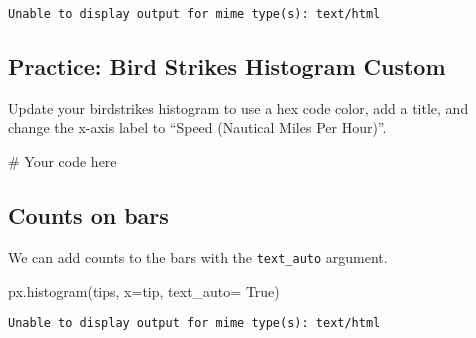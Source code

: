 \documentclass[
  letterpaper,
  DIV=11,
  numbers=noendperiod]{scrreprt}
\newenvironment{Shaded}{\begin{snugshade}}{\end{snugshade}}
\newcommand{\CommentTok}[1]{\textcolor[rgb]{0.37,0.37,0.37}{#1}}
\newcommand{\NormalTok}[1]{\textcolor[rgb]{0.00,0.23,0.31}{#1}}
\newcommand{\OperatorTok}[1]{\textcolor[rgb]{0.37,0.37,0.37}{#1}}
\newcommand{\StringTok}[1]{\textcolor[rgb]{0.13,0.47,0.30}{#1}}
\newcommand{\VariableTok}[1]{\textcolor[rgb]{0.07,0.07,0.07}{#1}}
\begin{document}
\begin{verbatim}
Unable to display output for mime type(s): text/html
\end{verbatim}

\begin{tcolorbox}[enhanced jigsaw, colframe=quarto-callout-tip-color-frame, opacityback=0, titlerule=0mm, bottomrule=.15mm, breakable, leftrule=.75mm, colbacktitle=quarto-callout-tip-color!10!white, title=\textcolor{quarto-callout-tip-color}{\faLightbulb}\hspace{0.5em}{Practice}, rightrule=.15mm, coltitle=black, opacitybacktitle=0.6, colback=white, left=2mm, arc=.35mm, toptitle=1mm, bottomtitle=1mm, toprule=.15mm]

\subsection{Practice: Bird Strikes Histogram
Custom}\label{practice-bird-strikes-histogram-custom}

Update your birdstrikes histogram to use a hex code color, add a title,
and change the x-axis label to ``Speed (Nautical Miles Per Hour)''.

\begin{Shaded}
\begin{Highlighting}[]
\CommentTok{\# Your code here}
\end{Highlighting}
\end{Shaded}

\end{tcolorbox}

\subsection{Counts on bars}\label{counts-on-bars}

We can add counts to the bars with the \texttt{text\_auto} argument.

\begin{Shaded}
\begin{Highlighting}[]
\NormalTok{px.histogram(tips, x}\OperatorTok{=}\StringTok{\textquotesingle{}tip\textquotesingle{}}\NormalTok{, text\_auto}\OperatorTok{=} \VariableTok{True}\NormalTok{)}
\end{Highlighting}
\end{Shaded}

\begin{verbatim}
Unable to display output for mime type(s): text/html
\end{verbatim}
\end{document}
